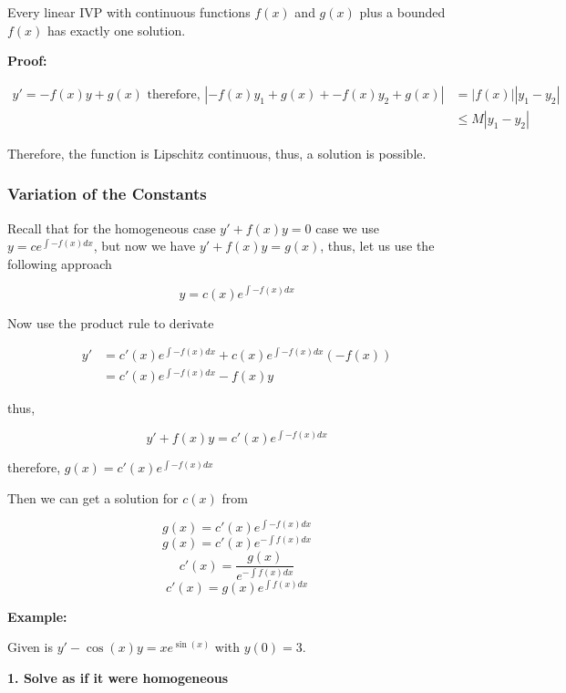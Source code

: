 Every linear IVP with continuous functions \(f(x)\) and \(g(x)\) plus a bounded \(f(x)\) 
has exactly one solution.
\vspace{\baselineskip}

\textbf{Proof:}

\begin{align*}
y' = -f(x)y + g(x) \text{ therefore, } |-f(x)y_1 + g(x) + -f(x)y_2 + g(x) | &= |f(x)||y_1 - y_2|\\
                                                                        &\le M |y_1 - y_2|
\end{align*}

Therefore, the function is Lipschitz continuous, thus, a solution is possible.
\QED


\subsubsection{Variation of the Constants}

Recall that for the homogeneous case \(y' + f(x)y = 0\) case we use 
\(y = c e^{\int -f(x) dx}\), but now we have \(y' + f(x)y = g(x)\), thus, let us use the following
approach

\[y = c(x) e^{\int -f(x) dx}\]

Now use the product rule to derivate

\begin{align*}
y' &= c'(x) e^{\int -f(x) dx} + c(x)e^{\int -f(x) dx}(-f(x))\\
   &= c'(x)e^{\int -f(x) dx} - f(x)y
\end{align*}

thus, 

\[y' + f(x)y = c'(x)e^{\int -f(x) dx}\]

therefore, \(g(x) = c'(x)e^{\int -f(x) dx}\)
\vspace{\baselineskip}

Then we can get a solution for \(c(x)\) from

\[
g(x) = c'(x)e^{\int -f(x) dx}
\]
\[
g(x) = c'(x)e^{-\int f(x) dx}
\]
\[
c'(x) = \frac{g(x)}{e^{-\int f(x) dx}}
\]
\[
    c'(x) = g(x)e^{\int f(x) dx}
\]

\textbf{Example: }
\vspace{\baselineskip}

Given is \(y' -\cos(x)y = x e^{\sin(x)}\) with \(y(0) = 3\).
\vspace{\baselineskip}

\textbf{1. Solve as if it were homogeneous}

